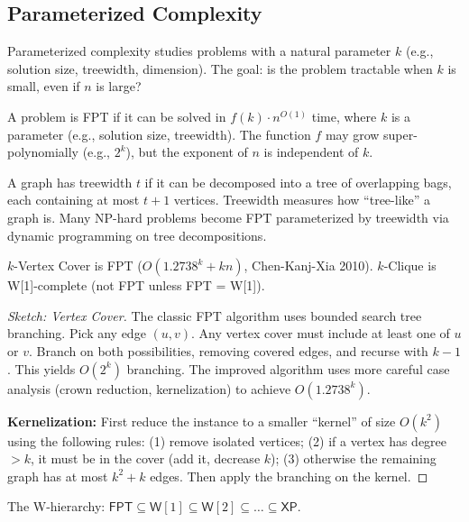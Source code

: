 \subsection{Parameterized Complexity}
\label{sec:complexity:param}

Parameterized complexity studies problems with a natural parameter $k$ (e.g., solution size, treewidth, dimension). The goal: is the problem tractable when $k$ is small, even if $n$ is large?

\begin{definition}
A problem is FPT if it can be solved in $f(k) \cdot n^{O(1)}$ time, where $k$ is a parameter (e.g., solution size, treewidth). The function $f$ may grow super-polynomially (e.g., $2^k$), but the exponent of $n$ is independent of $k$.
\end{definition}

\begin{definition}[Treewidth]
A graph has treewidth $t$ if it can be decomposed into a tree of overlapping bags, each containing at most $t+1$ vertices. Treewidth measures how ``tree-like'' a graph is. Many NP-hard problems become FPT parameterized by treewidth via dynamic programming on tree decompositions.
\end{definition}

\begin{theorem}
$k$-Vertex Cover is FPT ($O(1.2738^k + kn)$, Chen-Kanj-Xia 2010). $k$-Clique is W[1]-complete (not FPT unless FPT = W[1]).
\end{theorem}

\begin{proof}[Sketch: Vertex Cover]
The classic FPT algorithm uses bounded search tree branching. Pick any edge $(u,v)$. Any vertex cover must include at least one of $u$ or $v$. Branch on both possibilities, removing covered edges, and recurse with $k-1$. This yields $O(2^k)$ branching. The improved algorithm uses more careful case analysis (crown reduction, kernelization) to achieve $O(1.2738^k)$.

\textbf{Kernelization:} First reduce the instance to a smaller ``kernel'' of size $O(k^2)$ using the following rules: (1) remove isolated vertices; (2) if a vertex has degree $> k$, it must be in the cover (add it, decrease $k$); (3) otherwise the remaining graph has at most $k^2 + k$ edges. Then apply the branching on the kernel.
\end{proof}

The W-hierarchy: $\mathsf{FPT} \subseteq \mathsf{W}[1] \subseteq \mathsf{W}[2] \subseteq \dots \subseteq \mathsf{XP}$.


